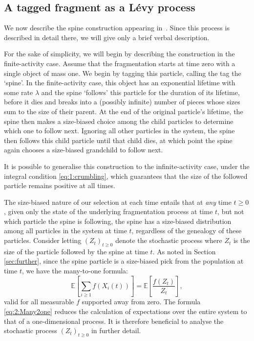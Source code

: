\documentclass[a4,12pt]{amsart}
\numberwithin{equation}{section}
\begin{document}
\subsection{A tagged fragment as a L\'evy process}\label{sec:one}

	We now describe the spine construction appearing in~\cite[Chapters 3.2.2 and 3.3.2]{bertoinbook}. 
	Since this process is described in detail there, we will give only a brief verbal description. 


For the sake of simplicity, we will begin by describing the construction in the finite-activity case. Assume that the fragmentation starts at time zero with a single object of mass one. We begin by tagging this particle, calling the tag the `spine'.
In the finite-activity case, this object has an exponential lifetime with some rate $\lambda$ and the spine `follows' this particle for the duration of its lifetime, before it dies and breaks into a (possibly infinite) number of pieces whose sizes sum to the size of their parent. At the end of the original particle's lifetime, the spine then makes a size-biased choice among the child particles to determine which one to follow next. Ignoring all other particles in the system, the spine then follows this child particle until that child dies, at which point the spine again chooses a size-biased grandchild to follow next. 

It is possible to generalise this construction to the infinite-activity case, under the integral condition \eqref{eq:1:crumbling}, which guarantees that the size of the followed particle remains positive at all times.

	The size-biased nature of our selection at each time entails that at \emph{any} time $t \geq 0$, 
	given only the state of the underlying fragmentation process at time $t$, 
	but not which particle the spine is following, the spine has a size-biased distribution 
	among all particles in the system at time $t$, regardless of the genealogy of these particles. 
	Consider letting $(Z_t)_{t \geq 0}$ denote the stochastic process where $Z_t$ is the size of the 
	particle followed by the spine at time $t$. As noted in Section \ref{sec:further}, since the spine particle is a size-biased 
	pick from the population at time $t$, we have the many-to-one formula:
	\begin{equation}\label{eq:2:Many2one}
		\mathbb{E} \left[ \sum_{i \geq 1} f(X_i(t)) \right] 
		= \mathbb{E} \left[ \frac{f(Z_t)}{Z_t} \right],
	\end{equation}
	valid for all measurable $f$ supported away from zero.
    The formula \eqref{eq:2:Many2one} reduces the calculation of expectations over the entire system to that of a one-dimensional process.
	It is therefore beneficial to analyse the stochastic process $(Z_t)_{t \geq 0}$ in further detail. 
\end{document}

